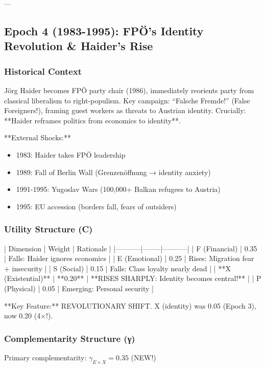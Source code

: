 ---

\subsection{Epoch 4 (1983-1995): FPÖ's Identity Revolution \& Haider's Rise}

\subsubsection{Historical Context}

Jörg Haider becomes FPÖ party chair (1986), immediately reorients party from classical liberalism to right-populism. Key campaign: ``Falsche Fremde!'' (False Foreigners!), framing guest workers as threats to Austrian identity. Crucially: **Haider reframes politics from economics to identity**.

**External Shocks:**
\begin{itemize}
\item 1983: Haider takes FPÖ leadership
\item 1989: Fall of Berlin Wall (Grenzenöffnung → identity anxiety)
\item 1991-1995: Yugoslav Wars (100,000+ Balkan refugees to Austria)
\item 1995: EU accession (borders fall, fears of outsiders)
\end{itemize}

\subsubsection{Utility Structure (C)}

| Dimension | Weight | Rationale |
|-----------|--------|-----------|
| F (Financial) | 0.35 | Falls: Haider ignores economics |
| E (Emotional) | 0.25 | Rises: Migration fear + insecurity |
| S (Social) | 0.15 | Falls: Class loyalty nearly dead |
| **X (Existential)** | **0.20** | **RISES SHARPLY: Identity becomes central!** |
| P (Physical) | 0.05 | Emerging: Personal security |

**Key Feature:** REVOLUTIONARY SHIFT. X (identity) was 0.05 (Epoch 3), now 0.20 (4×!).

\subsubsection{Complementarity Structure (γ)}

Primary complementarity: $\gamma_{E \times X} = 0.35$ (NEW!)

